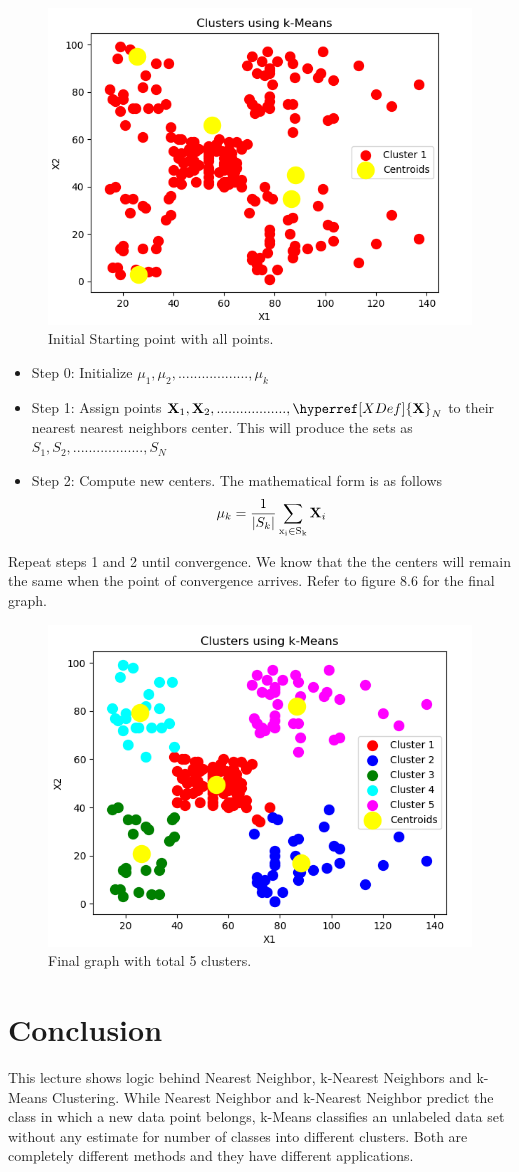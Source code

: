 \documentclass{article}
\theoremstyle{definition}
\newcommand{\bs}[1]{\boldsymbol{#1}} %
\def \X{{\hyperref[XDef]{\bs{{\rm X}}}}} %
\begin{document}
\begin{figure}[H]
	\centering
	\includegraphics[width=0.5\linewidth, scale=0.5]{initialstep.png}
	\caption{Initial Starting point with all points.}
\end{figure}

\begin{itemize}
  \item Step 0: Initialize $\mu_1, \mu_2, ..................,\mu_k$ 
  \item Step 1: Assign points $\textbf{X}_1, \textbf{X}_2, ..................,\X_N$ to their nearest nearest neighbors center. This will
  produce the sets as $S_1, S_2, ..................,S_N$
  \item Step 2: Compute new centers. The mathematical form is as follows
  \begin{equation*} 
\mu_k =  \frac{1}{|S_k|} \sum_{\rm{x}_i \in S_k} \textbf{X}_i
 \end{equation*}
  
\end{itemize}

 \begin{center}
 Repeat steps 1 and 2 until convergence. We know that the the centers will remain the same when the point of convergence arrives. Refer to figure 8.6 for the final graph.
 \end{center}

  
 \begin{figure}[H]
	\centering
	\includegraphics[width=0.5\linewidth, scale=0.5]{finalstep.png}
	\caption{Final graph with total 5 clusters.}
\end{figure}
  
\section{Conclusion}
This lecture shows logic behind Nearest Neighbor, k-Nearest Neighbors and k-Means Clustering.
While Nearest Neighbor and k-Nearest Neighbor predict the class in which a new data point belongs, k-Means classifies an unlabeled data set without any estimate for number of classes into different clusters. Both are completely different methods and they have different applications.
\end{document}
